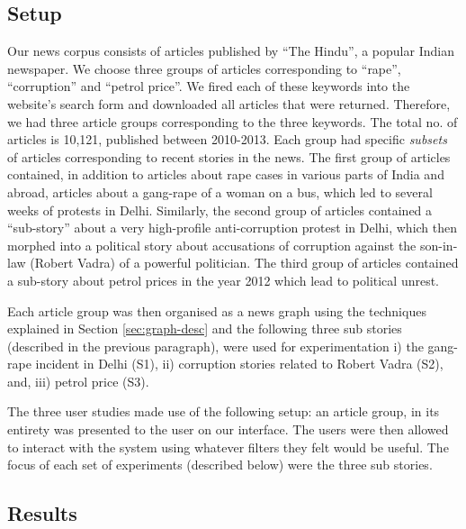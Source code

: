 \subsection{Setup}
Our news corpus consists of articles published by ``The Hindu'', a popular Indian newspaper. We choose three groups of articles corresponding to ``rape'', ``corruption'' and ``petrol price''. We fired each of these keywords into the website's search form and downloaded all articles that were returned. Therefore, we had three article groups corresponding to the three keywords. The total no. of articles is 10,121, published between 2010-2013. Each group had specific \emph{subsets} of articles corresponding to recent stories in the news. The first group of articles contained, in addition to articles about rape cases in various parts of India and abroad, articles about a gang-rape of a woman on a bus, which led to several weeks of protests in Delhi. Similarly, the second group of articles contained a ``sub-story'' about a very high-profile anti-corruption protest in Delhi, which then morphed into a political story about accusations of corruption against the son-in-law (Robert Vadra) of a powerful politician. The third group of articles contained a sub-story about petrol prices in the year 2012 which lead to political unrest. %

Each article group was then organised as a news graph using the techniques explained in Section \ref{sec:graph-desc}  %
and the following three sub stories (described in the previous paragraph), were used for experimentation i) the gang-rape incident in Delhi (S1), ii) corruption stories related to Robert Vadra (S2), and, iii) petrol price (S3).

The three user studies made use of the following setup: an article group, in its entirety was presented to the user on our interface. The users were then allowed to interact with the system using whatever filters they felt would be useful. The focus of each set of experiments (described below) were the three sub stories.


\subsection{Results}

